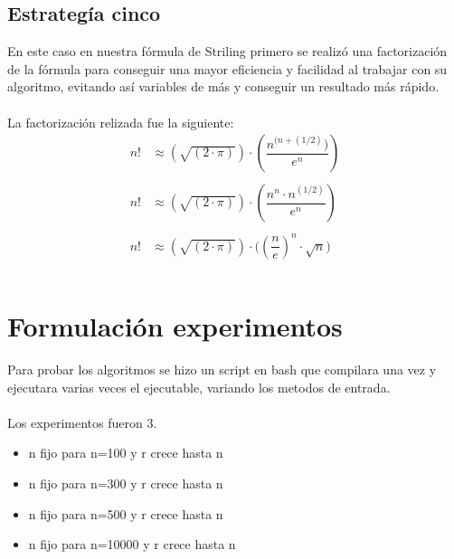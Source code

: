\documentclass[12pt,letterpaper]{scrartcl}
\begin{document}
\subsection{Estrategía cinco}

En este caso en nuestra fórmula de Striling primero se realizó una factorización de la fórmula para conseguir una mayor eficiencia y facilidad al trabajar con su algoritmo, evitando así
variables de más y conseguir un resultado más rápido.\\\\
La factorización relizada fue la siguiente:
\\
\[\begin{matrix}

{n!} &\approx {( \sqrt{(2 \cdot \pi)} )}\cdot{(\dfrac{n^{(n+(1/2)})}{e^n})}\\

&\\

{n!} &\approx {( \sqrt{(2 \cdot \pi)} )}\cdot{( \dfrac{ n^n \cdot n^{(1/2)} }{ e^n })}\\

&\\

{n!} &\approx {( \sqrt{(2 \cdot \pi)} )}\cdot{( ( \dfrac{ n }{ e } )^n }\cdot{ \sqrt{n} )}\\

&\\

\end{matrix}
\]

\newpage
\section{Formulación experimentos}

Para probar los algoritmos se hizo un script en bash que compilara una vez y ejecutara varias veces el ejecutable, variando los metodos de entrada. 
\\\\

Los experimentos fueron 3.

\begin{itemize}
\item n fijo para n=100 y r crece hasta n
\item n fijo para n=300 y r crece hasta n
\item n fijo para n=500 y r crece hasta n
\item n fijo para n=10000 y r crece hasta n
\end{itemize}
\end{document}
